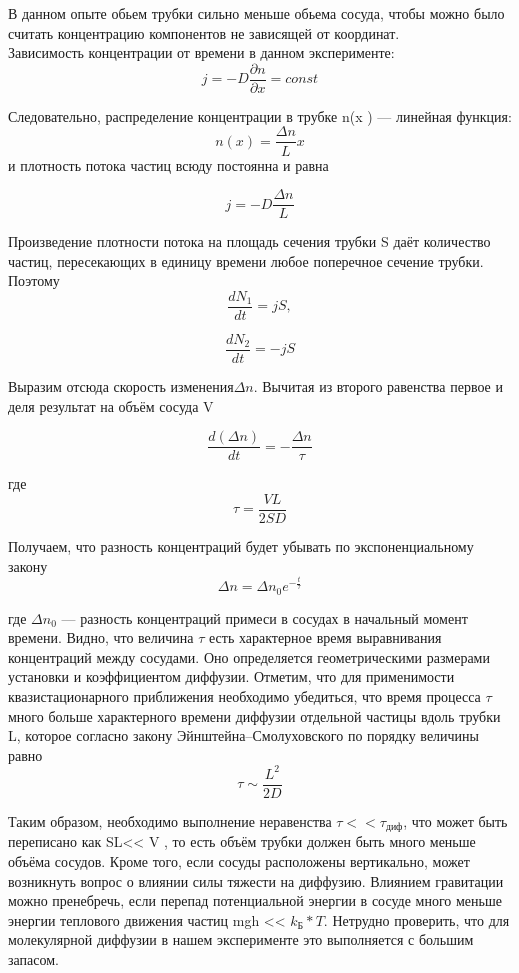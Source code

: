\documentclass[a4paper, 12pt]{article}%
\begin{document}
В данном опыте обьем трубки сильно меньше обьема сосуда, чтобы можно было считать концентрацию компонентов не зависящей от координат.\\

Зависимость концентрации от времени в данном эксперименте:\\
$$j = - D \frac{\partial n}{\partial x} = const $$

Следовательно, распределение концентрации в трубке n(x ) — линейная
функция:
		$$n(x) = \frac{\Delta n}{L} x $$
		и плотность потока частиц всюду постоянна и равна	

$$	j = - D \frac{\Delta n}{L} $$

 Произведение плотности
потока на площадь сечения трубки S даёт количество частиц, пересекающих в единицу времени любое поперечное сечение трубки. Поэтому
		$$\frac{dN_1}{dt} = jS,$$
		
	$$	\frac{dN_2}{dt} = -jS $$
	
	Выразим отсюда скорость изменения$ \Delta n $. Вычитая из второго равенства
	первое и деля результат на объём сосуда V
		
	$$	\frac{d(\Delta n)}{dt} = -\frac{\Delta n}{\tau}$$
		
		
		где $$	\tau = \frac{VL}{2SD} $$
	
	 Получаем, что разность концентраций будет убывать по экспоненциальному закону 
			 $$\Delta n = \Delta n_0 e^{-\frac{t}{\tau}} $$

где  $\Delta n_0$
— разность концентраций примеси в сосудах в начальный момент
времени. Видно, что величина $\tau$ есть характерное время выравнивания
концентраций между сосудами. Оно определяется геометрическими размерами установки и коэффициентом диффузии.
Отметим, что для применимости квазистационарного приближения необходимо убедиться, что время процесса $\tau$ много больше характерного
времени диффузии отдельной частицы вдоль трубки L, которое согласно
закону Эйнштейна–Смолуховского по порядку величины равно
			$$\tau \sim \frac{L^2}{2D}$$
			
Таким образом, необходимо выполнение неравенства $\tau << \tau_{\text{диф}}$, что может быть переписано как SL<< V , то есть объём трубки должен
быть много меньше объёма сосудов.
Кроме того, если сосуды расположены вертикально, может возникнуть
вопрос о влиянии силы тяжести на диффузию. Влиянием гравитации можно
пренебречь, если перепад потенциальной энергии в сосуде много меньше
энергии теплового движения частиц mgh << $k_{\text{Б}}*T$. Нетрудно проверить, что
для молекулярной диффузии в нашем эксперименте это выполняется с
большим запасом.
\end{document}
